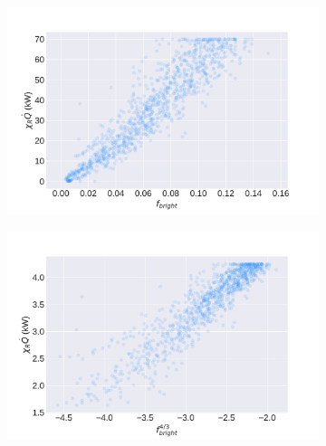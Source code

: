 \documentclass{article}
\begin{document}
\begin{figure}[htbp]
  \centering
  \begin{subfigure}[t]{.45\textwidth}
      \centering
      \includegraphics[width=\textwidth,keepaspectratio]{figures/frac_bright_scatterplot.pdf}
      \caption{}
      \label{fig:frac_bright}
  \end{subfigure}
  \begin{subfigure}[t]{.45\textwidth}
      \centering
      \includegraphics[width=\textwidth ,keepaspectratio]{figures/frac_bright43_scatterplot.pdf}
      \caption{}
      \label{fig:frac_bright_43}
  \end{subfigure}
  \caption{} 
  \label{fig:frac_bright_scatterplots}
\end{figure}
\end{document}
